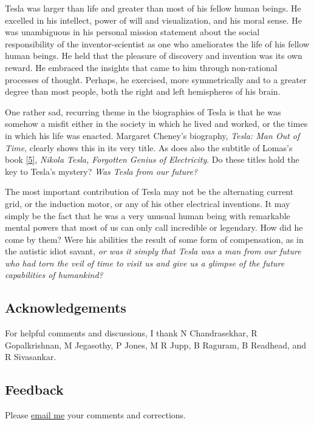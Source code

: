 \documentclass[
  a4paper,
]{article}
\begin{document}
Tesla was larger than life and greater than most of his fellow human
beings. He excelled in his intellect, power of will and visualization,
and his moral sense. He was unambiguous in his personal mission
statement about the social responsibility of the inventor-scientist as
one who ameliorates the life of his fellow human beings. He held that
the pleasure of discovery and invention was its own reward. He embraced
the insights that came to him through non-rational processes of thought.
Perhaps, he exercised, more symmetrically and to a greater degree than
most people, both the right and left hemispheres of his brain.

One rather sad, recurring theme in the biographies of Tesla is that he
was somehow a misfit either in the society in which he lived and worked,
or the times in which his life was enacted. Margaret Cheney's biography,
\emph{Tesla: Man Out of Time}, clearly shows this in its very title. As
does also the subtitle of Lomas's book
\protect\hyperlink{ref-lomas99}{{[}5{]}}, \emph{Nikola Tesla, Forgotten
Genius of Electricity}. Do these titles hold the key to Tesla's mystery?
\emph{Was Tesla from our future?}

The most important contribution of Tesla may not be the alternating
current grid, or the induction motor, or any of his other electrical
inventions. It may simply be the fact that he was a very unusual human
being with remarkable mental powers that most of us can only call
incredible or legendary. How did he come by them? Were his abilities the
result of some form of compensation, as in the autistic idiot savant,
\emph{or was it simply that Tesla was a man from our future who had torn
the veil of time to visit us and give us a glimpse of the future
capabilities of humankind?}

\hypertarget{acknowledgements}{%
\subsection{Acknowledgements}\label{acknowledgements}}

For helpful comments and discussions, I thank N Chandrasekhar, R
Gopalkrishnan, M Jegasothy, P Jones, M R Jupp, B Raguram, B Readhead,
and R Sivasankar.

\hypertarget{feedback}{%
\subsection{Feedback}\label{feedback}}

Please \href{mailto:feedback.swanlotus@gmail.com}{email me} your
comments and corrections.
\end{document}
